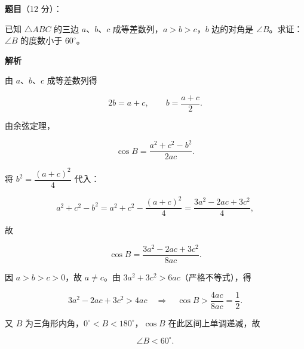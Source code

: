 \begin{answer}

\textbf{题目}（12 分）：

已知 $\triangle ABC$ 的三边 $a$、$b$、$c$ 成等差数列，$a>b>c$，$b$ 边的对角是 $\angle B$。求证：$\angle B$ 的度数小于 $60^\circ$。

\textbf{解析}

由 $a$、$b$、$c$ 成等差数列得

\nopagebreak[4]
\[
2b=a+c,
\qquad
b=\frac{a+c}{2}.
\]

由余弦定理，

\nopagebreak[4]
\[
\cos B=\frac{a^{2}+c^{2}-b^{2}}{2ac}.
\]

将 $b^{2}=\dfrac{(a+c)^{2}}{4}$ 代入：

\nopagebreak[4]
\[
a^{2}+c^{2}-b^{2}
=a^{2}+c^{2}-\frac{(a+c)^{2}}{4}
=\frac{3a^{2}-2ac+3c^{2}}{4},
\]

故

\nopagebreak[4]
\[
\cos B=\frac{3a^{2}-2ac+3c^{2}}{8ac}.
\]

因 $a>b>c>0$，故 $a\ne c$。由 $3a^{2}+3c^{2}>6ac$（严格不等式），得

\nopagebreak[4]
\[
3a^{2}-2ac+3c^{2}>4ac
\quad\Longrightarrow\quad
\cos B>\frac{4ac}{8ac}=\frac{1}{2}.
\]

又 $B$ 为三角形内角，$0^\circ<B<180^\circ$，$\cos B$ 在此区间上单调递减，故

\nopagebreak[4]
\[
\angle B<60^\circ.
\]


\end{answer}